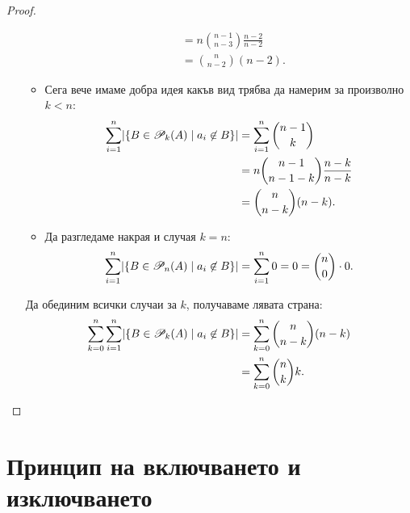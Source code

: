 \begin{proof}
\begin{itemize}
\begin{itemize}
\begin{align*}
        & = n\binom{n-1}{n-3}\frac{n-2}{n-2}\\
        & = \binom{n}{n-2}(n-2).
      \end{align*}
    \item
      Сега вече имаме добра идея какъв вид трябва да намерим за произволно $k < n$:
      \begin{align*}
        \sum^n_{i=1}\lvert{\{B \in \mathscr{P}_k(A) \mid a_i \not\in B\}}\rvert & = \sum^n_{i=1}\binom{n-1}{k}\\
        & = n\binom{n-1}{n-1-k}\frac{n-k}{n-k}\\
        & = \binom{n}{n-k}(n-k).
      \end{align*}
    \item
      Да разгледаме накрая и случая $k = n$:
      \[\sum^n_{i=1}\lvert{\{B \in \mathscr{P}_n(A) \mid a_i \not\in B\}}\rvert = \sum^n_{i=1}0 = 0 = \binom{n}{0}\cdot 0.\]
  \end{itemize}
  Да обединим всички случаи за $k$, получаваме лявата страна:
  \begin{align*}
    \sum^n_{k=0}\sum^n_{i=1}\lvert{\{B \in \mathscr{P}_k(A) \mid a_i \not\in B\}}\rvert & = \sum^n_{k=0} \binom{n}{n-k}(n-k)\\
    & = \sum^{n}_{k=0}\binom{n}{k}k.
  \end{align*}
\end{itemize}
\end{proof}

\section{Принцип на включването и изключването}

